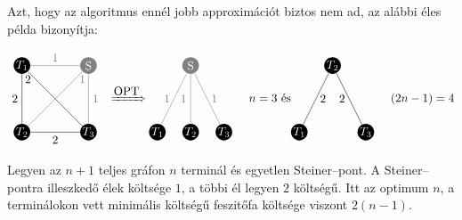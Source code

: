 Azt, hogy az algoritmus ennél jobb approximációt biztos nem ad, az alábbi éles
példa bizonyítja:

\[
\parbox[l]{3cm}{
\begin{tikzpicture}[scale=1]
  \tikzset{ p/.style={circle,white,fill=gray,inner sep=0pt,minimum size=0.5cm},
  }
  \node[p,fill=black] (T1) at (-1,  1) {$T_1$};
  \node[p,fill=black] (T2) at (-1, -1) {$T_2$}; 
  \node[p,fill=black] (T3) at (+1 , -1) {$T_3$};
  \node[p] (S) at (+1 , 1) {S};
  
  \draw[-] (T1) -- (T3) node [at start, below] {$2$}; 
  \draw[-] (T1) -- (T2) node [midway, left] {$2$}; 
  \draw[-] (T2) -- (T3) node [midway, below] {$2$};
  
  \draw[-,gray] (T1) -- (S) node [midway, above] {$1$}; 
  \draw[-,gray] (T2) -- (S) node [at end, below] {$1$}; 
  \draw[-,gray] (T3) -- (S) node [midway, right] {$1$};
\end{tikzpicture}
}
\xRightarrow{\mbox{OPT}}
\parbox[l]{3cm}{
\begin{tikzpicture}[scale=1]
  \tikzset{ p/.style={circle,white,fill=gray,inner sep=0pt,minimum size=0.5cm},
  }
  \node[p,fill=black] (T1) at (-1,  0) {$T_1$};
  \node[p,fill=black] (T2) at (0, 0) {$T_2$}; 
  \node[p,fill=black] (T3) at (+1 , 0) {$T_3$};
  \node[p] (S) at (0 , 2) {S};
  
  \draw[-,gray] (T1) -- (S) node [midway, left] {$1$}; 
  \draw[-,gray] (T2) -- (S) node [midway, left] {$1$}; 
  \draw[-,gray] (T3) -- (S) node [midway, right] {$1$};
\end{tikzpicture}
}
n=3 \mbox{ és}
\parbox[l]{3cm}{
\begin{tikzpicture}[scale=1]
  \tikzset{ p/.style={circle,white,fill=gray,inner sep=0pt,minimum size=0.5cm},
  }
  \node[p,fill=black] (T1) at (-1,  0) {$T_1$};
  \node[p,fill=black] (T2) at (0, 2) {$T_2$}; 
  \node[p,fill=black] (T3) at (+1 , 0) {$T_3$};
  
  \draw[-] (T1) -- (T2) node [midway, right] {$2$}; 
  \draw[-] (T2) -- (T3) node [midway, left] {$2$};  
\end{tikzpicture}
}(2n-1)=4
\]

Legyen az $n+1$ teljes gráfon $n$ terminál és egyetlen Steiner--pont. A
Steiner--pontra illeszkedő élek költsége $1$, a többi él legyen $2$ költségű. 
Itt az optimum $n$, a terminálokon vett minimális költségű feszitőfa költsége
viszont $2(n-1)$.
